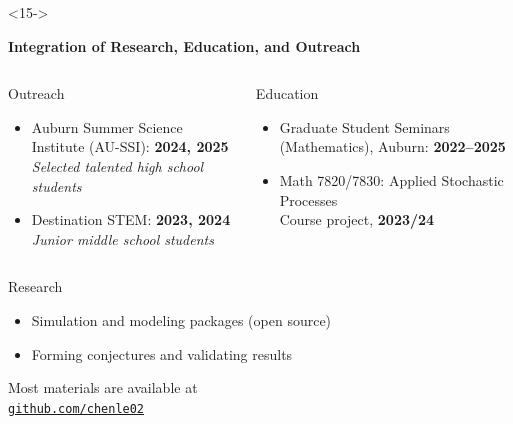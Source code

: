 \documentclass[9pt,table,xcolor=dvipsnames]{beamer}
\begin{document}
\begin{frame}[noframenumbering] %
  \titlepage
\end{frame}
\begin{frame}<15->%

  \begin{center}
    \textbf{Integration of Research, Education, and Outreach}
  \end{center}
  \vfill
  \small  %

  \begin{columns}[T,onlytextwidth]
    \begin{block}{Outreach}
      \begin{itemize}\itemsep4pt
        \item Auburn Summer Science Institute (AU-SSI): \textbf{2024, 2025} \\
              \emph{Selected talented high school students}
        \item Destination STEM: \textbf{2023, 2024}                         \\
              \emph{Junior middle school students}
      \end{itemize}
    \end{block}

    \begin{block}{Education}
      \begin{itemize}\itemsep2pt
        \item Graduate Student Seminars (Mathematics), Auburn: \textbf{2022--2025}
        \item Math 7820/7830: Applied Stochastic Processes \\
              Course project, \textbf{2023/24}
      \end{itemize}
    \end{block}

  \end{columns}
   \vfill
   \begin{center}
      \begin{minipage}{0.35\textwidth}
        \begin{block}{Research}
          \begin{itemize}\itemsep2pt
            \item Simulation and modeling packages (open source)
            \item Forming conjectures and validating results
          \end{itemize}
        \end{block}
      \end{minipage}
   \end{center}
  \vfill

  \begin{center}
    Most materials are available at \\ \bigskip
    \href{https://github.com/chenle02/}{\texttt{github.com/chenle02}}%
  \end{center}
\end{frame}
\end{document}
